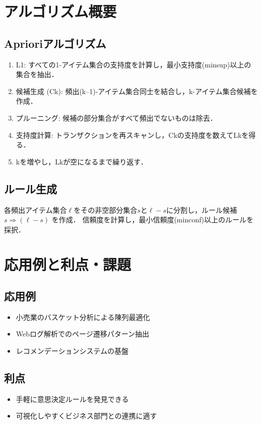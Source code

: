\documentclass[a4j]{jsarticle}
\begin{document}
\section{アルゴリズム概要}

\subsection{Aprioriアルゴリズム}

\begin{enumerate}
  \item L1: すべての1-アイテム集合の支持度を計算し，最小支持度(minsup)以上の集合を抽出．
  \item 候補生成 (Ck): 頻出(k--1)-アイテム集合同士を結合し，k-アイテム集合候補を作成．
  \item プルーニング: 候補の部分集合がすべて頻出でないものは除去．
  \item 支持度計算: トランザクションを再スキャンし，Ckの支持度を数えてLkを得る．
  \item kを増やし，Lkが空になるまで繰り返す．
\end{enumerate}

\subsection{ルール生成}

各頻出アイテム集合$\ell$をその非空部分集合$s$と$\ell-s$に分割し，ルール候補 $s \Rightarrow (\ell-s)$ を作成．
信頼度を計算し，最小信頼度(minconf)以上のルールを採択．

\section{応用例と利点・課題}

\subsection{応用例}
\begin{itemize}
  \item 小売業のバスケット分析による陳列最適化
  \item Webログ解析でのページ遷移パターン抽出
  \item レコメンデーションシステムの基盤
\end{itemize}

\subsection{利点}
\begin{itemize}
  \item 手軽に意思決定ルールを発見できる
  \item 可視化しやすくビジネス部門との連携に適す
\end{itemize}
\end{document}
